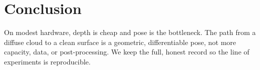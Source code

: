 \documentclass[10pt,twocolumn]{article}
\begin{document}
\section{Conclusion}
On modest hardware, depth is cheap and pose is the bottleneck. The path from a diffuse cloud to a clean surface is a
geometric, differentiable pose, not more capacity, data, or post-processing. We keep the full, honest record so the
line of experiments is reproducible.



\end{document}
